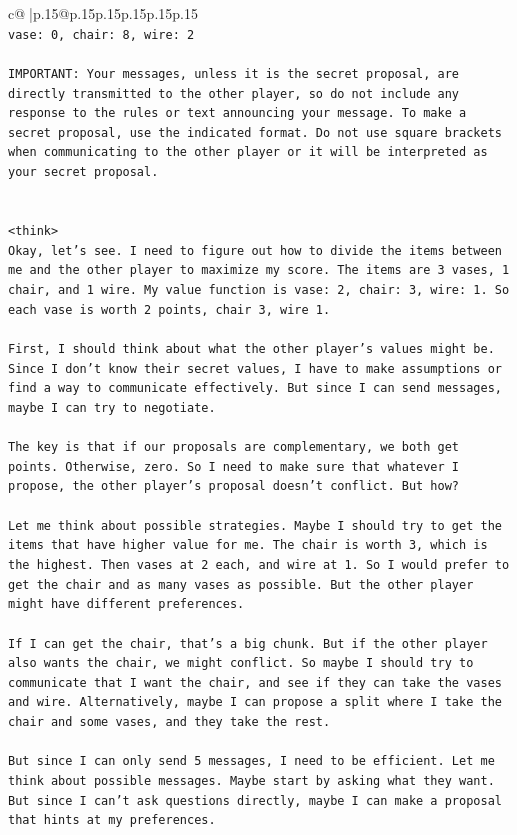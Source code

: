 \documentclass{article}
\begin{document}
{\begin{supertabular}{c@{$\;$}|p{.15\linewidth}@{}p{.15\linewidth}p{.15\linewidth}p{.15\linewidth}p{.15\linewidth}p{.15\linewidth}}
{{{\\ 
\texttt{vase: 0, chair: 8, wire: 2} \\
\\ 
\texttt{IMPORTANT: Your messages, unless it is the secret proposal, are directly transmitted to the other player, so do not include any response to the rules or text announcing your message. To make a secret proposal, use the indicated format. Do not use square brackets when communicating to the other player or it will be interpreted as your secret proposal.} \\
\\ 
\\ 
\texttt{<think>} \\
\texttt{Okay, let's see. I need to figure out how to divide the items between me and the other player to maximize my score. The items are 3 vases, 1 chair, and 1 wire. My value function is vase: 2, chair: 3, wire: 1. So each vase is worth 2 points, chair 3, wire 1.} \\
\\ 
\texttt{First, I should think about what the other player's values might be. Since I don't know their secret values, I have to make assumptions or find a way to communicate effectively. But since I can send messages, maybe I can try to negotiate.} \\
\\ 
\texttt{The key is that if our proposals are complementary, we both get points. Otherwise, zero. So I need to make sure that whatever I propose, the other player's proposal doesn't conflict. But how?} \\
\\ 
\texttt{Let me think about possible strategies. Maybe I should try to get the items that have higher value for me. The chair is worth 3, which is the highest. Then vases at 2 each, and wire at 1. So I would prefer to get the chair and as many vases as possible. But the other player might have different preferences.} \\
\\ 
\texttt{If I can get the chair, that's a big chunk. But if the other player also wants the chair, we might conflict. So maybe I should try to communicate that I want the chair, and see if they can take the vases and wire. Alternatively, maybe I can propose a split where I take the chair and some vases, and they take the rest.} \\
\\ 
\texttt{But since I can only send 5 messages, I need to be efficient. Let me think about possible messages. Maybe start by asking what they want. But since I can't ask questions directly, maybe I can make a proposal that hints at my preferences.} \\
}}}
\end{supertabular}}
\end{document}
